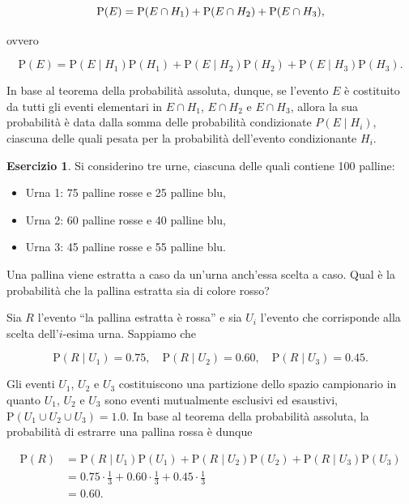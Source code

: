 \documentclass[
  11pt,
]{krantz}
\providecommand{\tightlist}{%
  \setlength{\itemsep}{0pt}\setlength{\parskip}{0pt}}
\theoremstyle{definition}
\theoremstyle{definition}
\theoremstyle{definition}
\newtheorem{exercise}{Esercizio}[chapter]
\theoremstyle{definition}
\theoremstyle{remark}
\begin{document}
\begin{equation}
{\mbox{P}}(E) = {\mbox{P}}(E \cap H_1) + {\mbox{P}}(E \cap H_2) + {\mbox{P}}(E \cap H_3), \notag
\label{eq:prob-total-1a}
\end{equation}

ovvero

\begin{equation}
{\mbox{P}}(E) = {\mbox{P}}(E \mid H_1) {\mbox{P}}(H_1) + {\mbox{P}}(E \mid H_2) {\mbox{P}}(H_2) + {\mbox{P}}(E \mid H_3) {\mbox{P}}(H_3).
\label{eq:prob-total-1b}
\end{equation}

In base al teorema della probabilità assoluta, dunque, se l'evento \(E\) è costituito da tutti gli eventi elementari in \(E \cap H_1\), \(E \cap H_2\) e \(E \cap H_3\), allora la sua probabilità è data dalla somma delle probabilità condizionate \(P(E \mid H_i)\), ciascuna delle quali pesata per la probabilità dell'evento condizionante \(H_i\).

\begin{exercise}
Si considerino tre urne, ciascuna delle quali contiene 100 palline:

\begin{itemize}
\tightlist
\item
  Urna 1: 75 palline rosse e 25 palline blu,
\item
  Urna 2: 60 palline rosse e 40 palline blu,
\item
  Urna 3: 45 palline rosse e 55 palline blu.
\end{itemize}

\noindent Una pallina viene estratta a caso da un'urna anch'essa scelta a caso. Qual è la probabilità che la pallina estratta sia di colore rosso?

Sia \(R\) l'evento ``la pallina estratta è rossa'' e sia \(U_i\) l'evento che corrisponde alla scelta dell'\(i\)-esima urna. Sappiamo che

\[
{\mbox{P}}(R \mid U_1) = 0.75, \quad {\mbox{P}}(R \mid U_2) = 0.60, \quad {\mbox{P}}(R \mid U_3) = 0.45.
\]

Gli eventi \(U_1\), \(U_2\) e \(U_3\) costituiscono una partizione dello spazio campionario in quanto \(U_1\), \(U_2\) e \(U_3\) sono eventi mutualmente esclusivi ed esaustivi, \({\mbox{P}}(U_1 \cup U_2 \cup U_3) = 1.0\). In base al teorema della probabilità assoluta, la probabilità di estrarre una pallina rossa è dunque

\[
\begin{split}
{\mbox{P}}(R) &= {\mbox{P}}(R \mid U_1){\mbox{P}}(U_1)+{\mbox{P}}(R \mid U_2){\mbox{P}}(U_2)+{\mbox{P}}(R \mid U_3){\mbox{P}}(U_3) \\
&= 0.75 \cdot \frac{1}{3}+0.60 \cdot \frac{1}{3}+0.45 \cdot \frac{1}{3} \\
&=0.60.
\end{split}
\]
\end{exercise}
\end{document}
